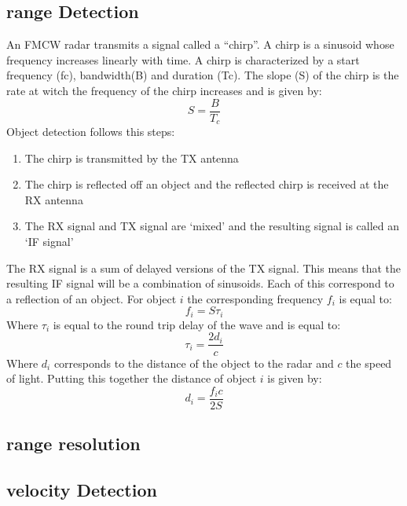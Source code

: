 \subsection{range Detection}
An FMCW radar transmits a signal called a “chirp”. A chirp is a sinusoid whose frequency  increases linearly with time.
A chirp is characterized by a start frequency (fc), bandwidth(B) and duration (Tc). The slope (S) of the chirp is the rate at witch the frequency of the chirp increases and is given by:
\begin{equation}
    S=\frac{B}{T_c}
\end{equation}
Object detection follows this steps:
\begin{enumerate}
    \item The chirp is transmitted by the TX antenna
    \item The chirp is reflected off an object and the reflected chirp is received at the RX antenna
    \item The RX signal and TX signal are ‘mixed’ and the resulting signal is called an ‘IF signal’
\end{enumerate}


The RX signal is a sum of delayed versions of the TX signal. This means that the resulting IF signal will be a combination of sinusoids. Each of this correspond to a reflection of an object. For object $i$ the corresponding frequency $f_i$ is equal to:
\begin{equation}
    f_i=S\tau_i
\end{equation}
Where $\tau_i$ is equal to the round trip delay of the wave and is equal to:
\begin{equation}
    \tau_i=\frac{2d_i}{c}
\end{equation}
Where $d_i$ corresponds to the distance of the object to the radar and $c$ the speed of light.
Putting this together the distance of object $i$ is given by:
\begin{equation}
    d_i=\frac{f_ic}{2S}
\end{equation}
\subsection{range resolution}
\subsection{velocity Detection}
